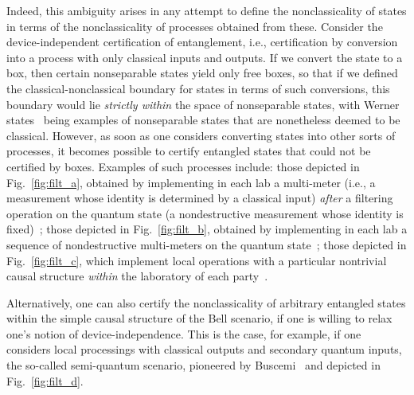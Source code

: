 \documentclass[prx,11pt,letterpaper,twocolumn,accepted=2023-11-27]{quantumarticle}
\theoremstyle{plain}
\theoremstyle{definition}
\begin{document}
Indeed, this ambiguity arises in any attempt 
  to define the nonclassicality of states in terms of the nonclassicality of processes obtained from these. 
   Consider the device-independent certification of entanglement, i.e., certification by 
   conversion into a process with only classical inputs and outputs.  
    If we convert the state to a box,
    then certain nonseparable states yield only free boxes, so that if we defined the classical-nonclassical boundary for states in terms of such conversions, this boundary would lie {\em strictly within} the space of nonseparable states, with Werner states~\cite{werner1989quantum} being examples of nonseparable states that are nonetheless deemed to be classical.   
However, as soon as one considers converting states into other sorts of processes, it becomes possible to certify entangled states that could not be certified by boxes.  Examples of such processes
include: those depicted in Fig.~\ref{fig:filt_a}, obtained by implementing in each lab a multi-meter (i.e., a measurement whose identity is determined by a classical input) {\em after} a filtering operation on the quantum state (a nondestructive measurement whose identity is fixed)~\cite{popescu1995bell,gisin1996hidden}; those depicted in Fig.~\ref{fig:filt_b}, obtained by implementing in each lab a sequence of nondestructive multi-meters on the quantum state~\cite{gallego2014nonlocality}; those depicted in Fig.~\ref{fig:filt_c}, which implement 
local operations with a particular nontrivial causal structure {\em within} the laboratory of each party~\cite{bowles2018device}.

Alternatively, one can also certify the nonclassicality of arbitrary entangled states within the simple causal structure of the Bell scenario, if one is willing to relax one's notion of device-independence. This is the case, for example, if one considers local processings with classical outputs and secondary quantum inputs, the so-called semi-quantum scenario, pioneered by Buscemi~\cite{Buscemi2012LOSR} and depicted in Fig.~\ref{fig:filt_d}.
\end{document}
